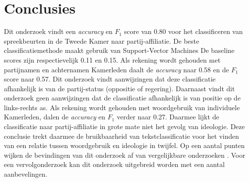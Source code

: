 \section{Conclusies}
\label{sec:conc}

Dit onderzoek vindt een \textit{accuracy} en $F_1$ score van 0.80 voor het classificeren van spreekbeurten in de Tweede Kamer naar partij-affiliatie. De beste classificatiemethode maakt gebruik van Support-Vector Machines De baseline scores zijn respectievelijk 0.11 en 0.15. Als rekening wordt gehouden met partijnamen en achternamen Kamerleden daalt de \textit{accuracy} naar 0.58 en de $F_1$ score naar 0.57. Dit onderzoek vindt aanwijzingen dat deze classificatie afhankelijk is van de partij-status (oppositie of regering). Daarnaast vindt dit onderzoek geen aanwijzingen dat de classificatie afhankelijk is van positie op de links-rechts as. Als rekening wordt gehouden met woordgebruik van individuele Kamerleden, dalen de \textit{accuracy} en $F_1$ verder naar 0.27. Daarmee lijkt de classificatie naar partij-affiliatie in grote mate niet het gevolg van ideologie. Deze conclusie trekt daarmee de bruikbaarheid van tekstclassificatie voor het vinden van een relatie tussen woordgebruik en ideologie in twijfel. Op een aantal punten wijken de bevindingen van dit onderzoek af van vergelijkbare onderzoeken \cite{Hirst_textto, diermeier_godbout_yu_kaufmann_2012}. Voor een vervolgonderzoek kan dit onderzoek uitgebreid worden met een aantal aanbevelingen.